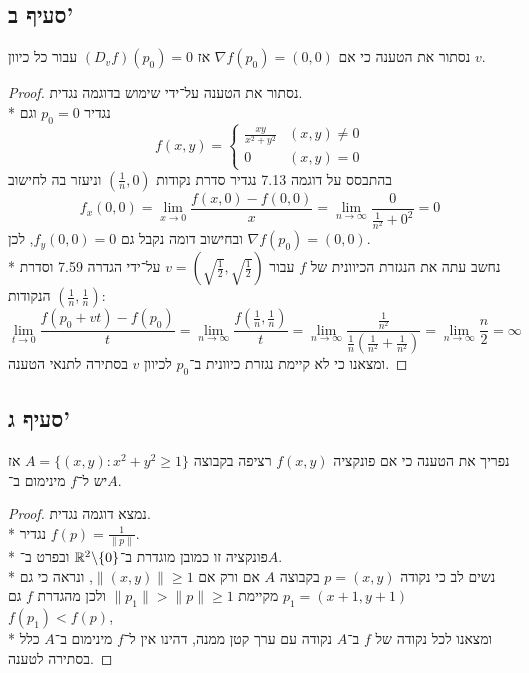 \subsection{סעיף ב'}
נסתור את הטענה כי אם $\nabla f(p_0) = (0, 0)$ אז $(D_v f)(p_0) = 0$ עבור כל כיוון $v$.
\begin{proof}
	נסתור את הטענה על־ידי שימוש בדוגמה נגדית. \\*
	נגדיר $p_0 = 0$ וגם 
	\[
		f(x, y) =
		\begin{cases}
			\frac{xy}{x^2 + y^2} & (x, y) \ne 0 \\
			0 & (x, y) = 0
		\end{cases}
	\]
	בהתבסס על דוגמה 7.13 נגדיר סדרת נקודות $(\frac{1}{n}, 0)$ וניעזר בה לחישוב
	\[
		f_x(0, 0)
		= \lim_{x \to 0} \frac{f(x, 0) - f(0, 0)}{x}
		= \lim_{n \to \infty} \frac{0}{\frac{1}{n^2} + 0^2}
		= 0
	\]
	ובחישוב דומה נקבל גם $f_y(0, 0) = 0$, לכן $\nabla f(p_0) = (0, 0)$. \\*
	נחשב עתה את הנגזרת הכיוונית של $f$ עבור $v = (\sqrt{\frac{1}{2}}, \sqrt{\frac{1}{2}})$ על־ידי הגדרה 7.59 וסדרת הנקודות $(\frac{1}{n}, \frac{1}{n})$:
	\[
		\lim_{t \to 0} \frac{f(p_0 + vt) - f(p_0)}{t}
		= \lim_{n \to \infty} \frac{f(\frac{1}{n}, \frac{1}{n})}{t}
		= \lim_{n \to \infty} \frac{\frac{1}{n^2}}{\frac{1}{n} (\frac{1}{n^2} + \frac{1}{n^2})}
		= \lim_{n \to \infty} \frac{n}{2}
		= \infty
	\]
	ומצאנו כי לא קיימת נגזרת כיוונית ב־$p_0$ לכיוון $v$ בסתירה לתנאי הטענה.
\end{proof}

\subsection{סעיף ג'}
נפריך את הטענה כי אם פונקציה $f(x, y)$ רציפה בקבוצה $A = \{ (x, y) : x^2 + y^2 \ge 1 \}$ אז יש ל־$f$ מינימום ב־$A$.
\begin{proof}
	נמצא דוגמה נגדית. \\*
	נגדיר $f(p) = \frac{1}{\lVert p \rVert}$. \\*
	פונקציה זו כמובן מוגדרת ב־$\mathbb{R}^2\backslash \{0\}$ ובפרט ב־$A$. \\*
	נשים לב כי נקודה $p = (x, y)$ בקבוצה $A$ אם ורק אם $\lVert (x, y) \rVert \ge 1$,
	ונראה כי גם $p_1 = (x + 1, y + 1)$ מקיימת $\lVert p_1 \rVert > \lVert p \rVert \ge 1$ ולכן מהגדרת $f$ גם $f(p_1) < f(p)$, \\*
	ומצאנו לכל נקודה של $f$ ב־$A$ נקודה עם ערך קטן ממנה, דהינו אין ל־$f$ מינימום ב־$A$ כלל בסתירה לטענה.
\end{proof}



